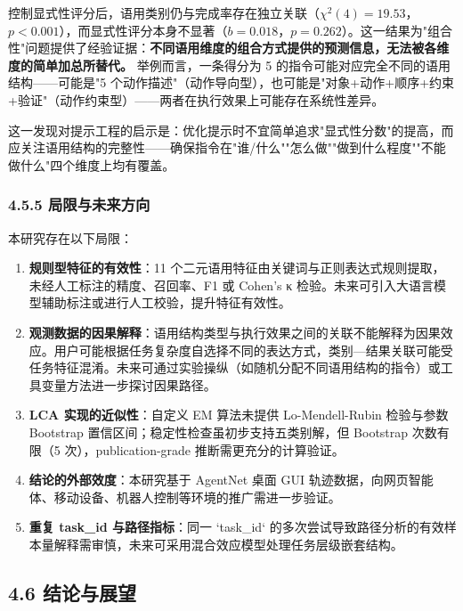 \documentclass[12pt,a4paper,openany,oneside]{ctexrep}
\begin{document}
控制显式性评分后，语用类别仍与完成率存在独立关联（$\chi^2(4)=19.53$，$p<0.001$），而显式性评分本身不显著（$b=0.018$，$p=0.262$）。这一结果为"组合性"问题提供了经验证据：\textbf{不同语用维度的组合方式提供的预测信息，无法被各维度的简单加总所替代。} 举例而言，一条得分为 5 的指令可能对应完全不同的语用结构——可能是"5 个动作描述"（动作导向型），也可能是"对象+动作+顺序+约束+验证"（动作约束型）——两者在执行效果上可能存在系统性差异。

这一发现对提示工程的启示是：优化提示时不宜简单追求"显式性分数"的提高，而应关注语用结构的完整性——确保指令在"谁/什么""怎么做""做到什么程度""不能做什么"四个维度上均有覆盖。

\subsubsection{4.5.5 局限与未来方向}


本研究存在以下局限：

\begin{enumerate}
\item[1.] \textbf{规则型特征的有效性}：11 个二元语用特征由关键词与正则表达式规则提取，未经人工标注的精度、召回率、F1 或 Cohen's κ 检验。未来可引入大语言模型辅助标注或进行人工校验，提升特征有效性。

\item[2.] \textbf{观测数据的因果解释}：语用结构类型与执行效果之间的关联不能解释为因果效应。用户可能根据任务复杂度自选择不同的表达方式，类别—结果关联可能受任务特征混淆。未来可通过实验操纵（如随机分配不同语用结构的指令）或工具变量方法进一步探讨因果路径。

\item[3.] \textbf{LCA 实现的近似性}：自定义 EM 算法未提供 Lo-Mendell-Rubin 检验与参数 Bootstrap 置信区间；稳定性检查虽初步支持五类别解，但 Bootstrap 次数有限（5 次），publication-grade 推断需更充分的计算验证。

\item[4.] \textbf{结论的外部效度}：本研究基于 AgentNet 桌面 GUI 轨迹数据，向网页智能体、移动设备、机器人控制等环境的推广需进一步验证。

\item[5.] \textbf{重复 task\_id 与路径指标}：同一 `task\_id` 的多次尝试导致路径分析的有效样本量解释需审慎，未来可采用混合效应模型处理任务层级嵌套结构。
\end{enumerate}


\subsection{4.6 结论与展望}
\end{document}

